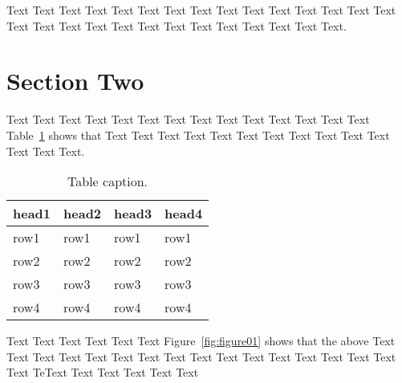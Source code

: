\documentclass{article}
\begin{document}
Text Text Text Text Text Text Text Text Text Text Text Text Text Text 
Text Text Text Text Text Text Text Text Text Text Text Text Text
Text. 

\newpage


\section{Section Two}
\label{sec:section2}

%

Text Text Text Text Text Text Text Text Text Text Text Text Text Text 
Table~\ref{tab:table01} shows that Text Text Text Text Text Text Text Text 
Text Text Text Text Text Text.

\begin{table}[htbp]
  \caption{Table caption.}
  \label{tab:table01}
  \centering
  \begin{tabular}{llll}
    \toprule
    head1 & head2 & head3 & head4\\
    \midrule
    row1 & row1 & row1 & row1\\
    row2 & row2 & row2 & row2\\
    row3 & row3 & row3 & row3\\
    row4 & row4 & row4 & row4\\
    \bottomrule
  \end{tabular}
\end{table}

Text Text Text  Text Text Text Figure~\ref{fig:figure01} shows that the
above Text Text Text  Text Text Text Text Text Text  Text Text Text 
Text Text Text  Text Text TeText Text Text  Text Text Text  





\end{document}
